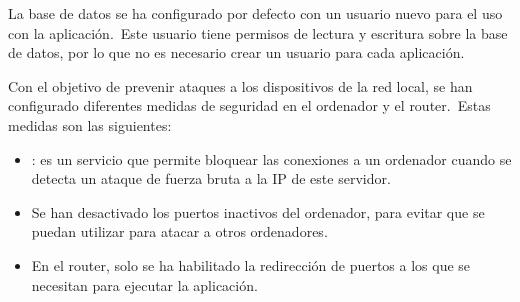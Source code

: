 La base de datos se ha configurado por defecto con un usuario nuevo para el uso con la aplicación.\ Este usuario tiene
permisos de lectura y escritura sobre la base de datos, por lo que no es necesario crear un usuario para cada
aplicación.

Con el objetivo de prevenir ataques a los dispositivos de la red local, se han configurado diferentes medidas de seguridad en el
ordenador y el router.\ Estas medidas son las siguientes:
\begin{itemize}
	\item {}: es un servicio que permite bloquear las conexiones a un ordenador cuando se detecta un
	ataque de fuerza bruta a la IP de este servidor.
	\item Se han desactivado los puertos inactivos del ordenador, para evitar que se puedan utilizar para
	atacar a otros ordenadores.
	\item En el router, solo se ha habilitado la redirección de puertos a los que se necesitan para ejecutar la
	aplicación.
\end{itemize}
